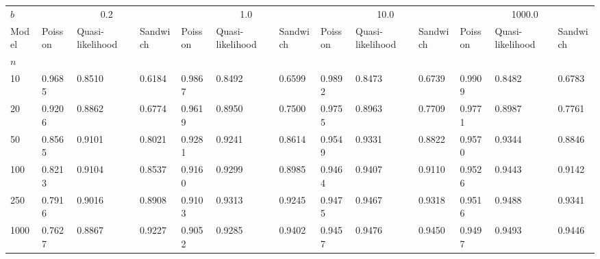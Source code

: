 \begin{tabular}{lllllllllllll}
\toprule
$b$ & \multicolumn{3}{c}{0.2} & \multicolumn{3}{c}{1.0} & \multicolumn{3}{c}{10.0} & \multicolumn{3}{c}{1000.0} \\
Model & Poisson & Quasi-likelihood & Sandwich & Poisson & Quasi-likelihood & Sandwich & Poisson & Quasi-likelihood & Sandwich & Poisson & Quasi-likelihood & Sandwich \\
$n$  &         &                  &          &         &                  &          &         &                  &          &         &                  &          \\
\midrule
10   &  0.9685 &           0.8510 &   0.6184 &  0.9867 &           0.8492 &   0.6599 &  0.9892 &           0.8473 &   0.6739 &  0.9909 &           0.8482 &   0.6783 \\
20   &  0.9206 &           0.8862 &   0.6774 &  0.9619 &           0.8950 &   0.7500 &  0.9755 &           0.8963 &   0.7709 &  0.9771 &           0.8987 &   0.7761 \\
50   &  0.8565 &           0.9101 &   0.8021 &  0.9281 &           0.9241 &   0.8614 &  0.9549 &           0.9331 &   0.8822 &  0.9570 &           0.9344 &   0.8846 \\
100  &  0.8213 &           0.9104 &   0.8537 &  0.9160 &           0.9299 &   0.8985 &  0.9464 &           0.9407 &   0.9110 &  0.9526 &           0.9443 &   0.9142 \\
250  &  0.7916 &           0.9016 &   0.8908 &  0.9103 &           0.9313 &   0.9245 &  0.9475 &           0.9467 &   0.9318 &  0.9516 &           0.9488 &   0.9341 \\
1000 &  0.7627 &           0.8867 &   0.9227 &  0.9052 &           0.9285 &   0.9402 &  0.9457 &           0.9476 &   0.9450 &  0.9497 &           0.9493 &   0.9446 \\
\bottomrule
\end{tabular}
